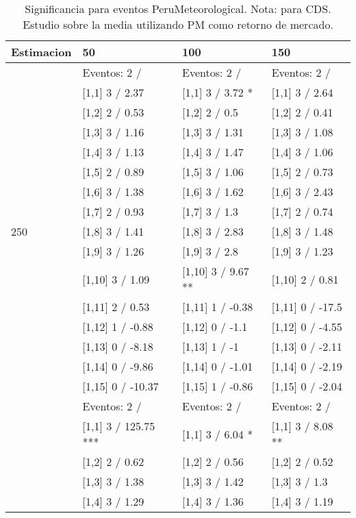 \begin{table}

\caption{Significancia para eventos PeruMeteorological. Nota: para CDS. Estudio sobre la media utilizando PM como retorno de mercado.}
\centering
\begin{tabular}[t]{llll}
\toprule
Estimacion & 50 & 100 & 150\\
\midrule
 & Eventos:  2 / & Eventos:  2 / & Eventos:  2 /\\
 & {}[1,1] 3  / 2.37 & {}[1,1] 3  / 3.72 * & {}[1,1] 3  / 2.64\\
 & {}[1,2] 2  / 0.53 & {}[1,2] 2  / 0.5 & {}[1,2] 2  / 0.41\\
 & {}[1,3] 3  / 1.16 & {}[1,3] 3  / 1.31 & {}[1,3] 3  / 1.08\\
 & {}[1,4] 3  / 1.13 & {}[1,4] 3  / 1.47 & {}[1,4] 3  / 1.06\\
\addlinespace
 & {}[1,5] 2  / 0.89 & {}[1,5] 3  / 1.06 & {}[1,5] 2  / 0.73\\
 & {}[1,6] 3  / 1.38 & {}[1,6] 3  / 1.62 & {}[1,6] 3  / 2.43\\
 & {}[1,7] 2  / 0.93 & {}[1,7] 3  / 1.3 & {}[1,7] 2  / 0.74\\
250 & {}[1,8] 3  / 1.41 & {}[1,8] 3  / 2.83 & {}[1,8] 3  / 1.48\\
 & {}[1,9] 3  / 1.26 & {}[1,9] 3  / 2.8 & {}[1,9] 3  / 1.23\\
\addlinespace
 & {}[1,10] 3  / 1.09 & {}[1,10] 3  / 9.67 ** & {}[1,10] 2  / 0.81\\
 & {}[1,11] 2  / 0.53 & {}[1,11] 1  / -0.38 & {}[1,11] 0  / -17.5\\
 & {}[1,12] 1  / -0.88 & {}[1,12] 0  / -1.1 & {}[1,12] 0  / -4.55\\
 & {}[1,13] 0  / -8.18 & {}[1,13] 1  / -1 & {}[1,13] 0  / -2.11\\
 & {}[1,14] 0  / -9.86 & {}[1,14] 0  / -1.01 & {}[1,14] 0  / -2.19\\
\addlinespace
 & {}[1,15] 0  / -10.37 & {}[1,15] 1  / -0.86 & {}[1,15] 0  / -2.04\\
 & Eventos:  2 / & Eventos:  2 / & Eventos:  2 /\\
 & {}[1,1] 3  / 125.75 *** & {}[1,1] 3  / 6.04 * & {}[1,1] 3  / 8.08 **\\
 & {}[1,2] 2  / 0.62 & {}[1,2] 2  / 0.56 & {}[1,2] 2  / 0.52\\
 & {}[1,3] 3  / 1.38 & {}[1,3] 3  / 1.42 & {}[1,3] 3  / 1.3\\
\addlinespace
 & {}[1,4] 3  / 1.29 & {}[1,4] 3  / 1.36 & {}[1,4] 3  / 1.19\\

\end{tabular}
\end{table}
